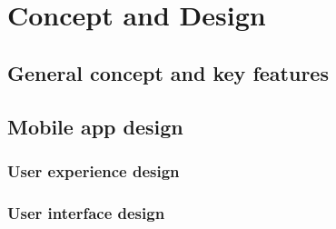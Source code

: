 \chapter{Concept and Design}
\label{cha:conceptanddesign}
\section{General concept and key features}

\section{Mobile app design}
\subsection{User experience design}
\subsection{User interface design}
